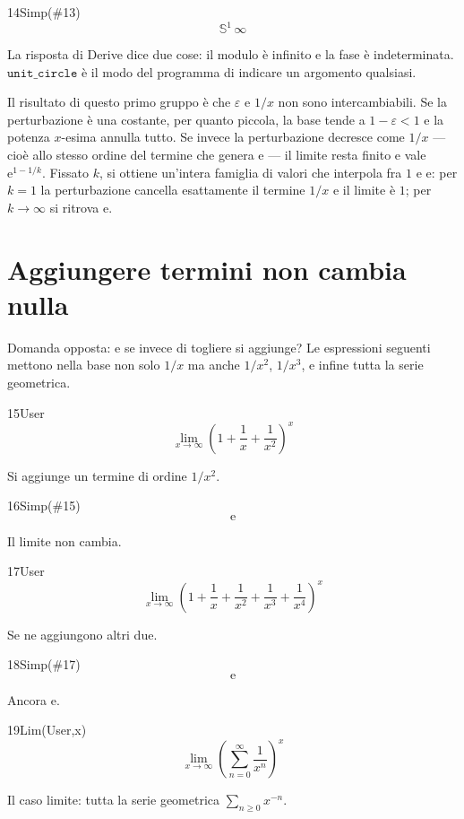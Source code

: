 \begin{espr}{14}{Simp(\#13)}{}
\[
\mathbb{S}^{1}\, \infty
\]
\end{espr}
La risposta di Derive dice due cose: il modulo è infinito e la fase è indeterminata. $\mathtt{unit\_circle}$ è il modo del programma di indicare un argomento qualsiasi.


Il risultato di questo primo gruppo è che $\varepsilon$ e $1/x$ non sono intercambiabili. Se la perturbazione è una costante, per quanto piccola, la base tende a $1-\varepsilon<1$ e la potenza $x$-esima annulla tutto. Se invece la perturbazione decresce come $1/x$ — cioè allo stesso ordine del termine che genera $\mathrm{e}$ — il limite resta finito e vale $\mathrm{e}^{1-1/k}$. Fissato $k$, si ottiene un'intera famiglia di valori che interpola fra $1$ e $\mathrm{e}$: per $k=1$ la perturbazione cancella esattamente il termine $1/x$ e il limite è $1$; per $k\to\infty$ si ritrova $\mathrm{e}$.

\section{Aggiungere termini non cambia nulla}

Domanda opposta: e se invece di togliere si aggiunge? Le espressioni seguenti mettono nella base non solo $1/x$ ma anche $1/x^2$, $1/x^3$, e infine tutta la serie geometrica.

\begin{espr}{15}{User}{}
\[
\lim_{x \to \infty} \left(1 + \frac{1}{x} + \frac{1}{x^{2}}\right)^{x}
\]
\end{espr}
Si aggiunge un termine di ordine $1/x^2$.

\begin{espr}{16}{Simp(\#15)}{}
\[
\mathrm{e}
\]
\end{espr}
Il limite non cambia.

\begin{espr}{17}{User}{}
\[
\lim_{x \to \infty} \left(1 + \frac{1}{x} + \frac{1}{x^{2}} + \frac{1}{x^{3}} + \frac{1}{x^{4}}\right)^{x}
\]
\end{espr}
Se ne aggiungono altri due.

\begin{espr}{18}{Simp(\#17)}{}
\[
\mathrm{e}
\]
\end{espr}
Ancora $\mathrm{e}$.

\begin{espr}{19}{Lim(User,x)}{}
\[
\lim_{x \to \infty} \left(\sum_{n=0}^{\infty} \frac{1}{x^{n}}\right)^{x}
\]
\end{espr}
Il caso limite: tutta la serie geometrica $\sum_{n\ge0}x^{-n}$.

